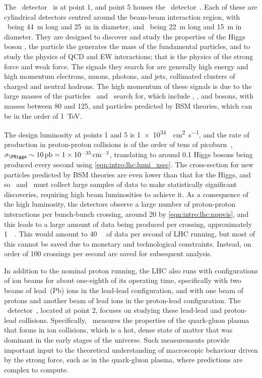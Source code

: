 The \atlas\ detector~\cite{Aad:2008zzm} is at point 1, and point 5 houses the 
\cms\ detector~\cite{Chatrchyan:2008aa}.
Each of these are cylindrical detectors centred around the beam-beam 
interaction region, with \atlas\ being \SI{44}{\metre} long and \SI{25}{\metre} 
in diameter, and \cms\ being \SI{22}{\metre} long and \SI{15}{\metre} in 
diameter.
They are designed to discover and study the properties of the Higgs boson 
\PHiggs, the particle the generates the mass of the fundamental particles, and 
to study the physics of \ac{QCD} and \ac{EW} interactions; that is the physics 
of the strong force and weak force.
The signals they search for are generally high energy and high momentum 
electrons, muons, photons, and jets, collimated clusters of charged and neutral 
hadrons.
The high momentum of these signals is due to the large masses of the particles 
\atlas\ and \cms\ search for, which include \PW, \PZ, and \PHiggs bosons, with 
masses between 80 and \SI{125}{\GeVcc}, and particles predicted by \ac{BSM} 
theories, which can be in the order of \SI{1}{\TeV}.

The design luminosity at points 1 and 5 is 
\SI{1e34}{\per\square\centi\metre\per\second}, and the rate of \PHiggs 
production in proton-proton collisions is of the order of tens of 
picobarn~\cite{Khachatryan:2016vau}, $\xsec_{\PHiggs} \sim \SI{10}{\pico\barn} 
= \SI{1e-35}{\per\square\centi\metre}$, translating to around 0.1 Higgs bosons 
being produced every second using \cref{eqn:intro:lhc:lumi_xsec}.
The cross-section for new particles predicted by \ac{BSM} theories are even 
lower than that for the Higgs, and so \atlas\ and \cms\ must collect large 
samples of data to make statistically significant discoveries, requiring high 
beam luminosities to achieve it.
As a consequence of the high luminosity, the detectors observe a large number 
of proton-proton interactions per bunch-bunch crossing, around 20 by 
\cref{eqn:intro:lhc:nppvis}, and this leads to a large amount of data being 
produced per crossing, approximately \SI{1}{\mega\byte}.
This would amount to \SI{40}{\tera\byte} of data per second of \ac{LHC} 
running, but most of this cannot be saved due to monetary and technological 
constraints.
Instead, on order of 100 crossings per second are saved for subsequent 
analysis.

In addition to the nominal proton running, the \ac{LHC} also runs with 
configurations of ion beams for about one-eighth of its operating time, 
specifically with two beams of lead~(Pb) ions in the lead-lead configuration, 
and with one beam of protons and another beam of lead ions in the proton-lead 
configuration.
The \alice\ detector~\cite{Aamodt:2008zz}, located at point 2, focuses on 
studying these lead-lead and proton-lead collisions.
Specifically, \alice\ measures the properties of the quark-gluon plasma that 
forms in ion collisions, which is a hot, dense state of matter that was 
dominant in the early stages of the universe.
Such measurements provide important input to the theoretical understanding of 
macroscopic behaviour driven by the strong force, such as in the quark-gluon 
plasma, where predictions are complex to compute.


